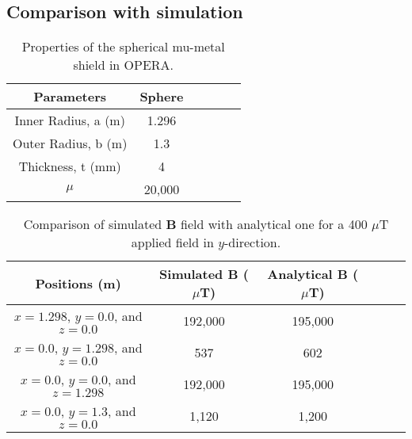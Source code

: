 \subsection{Comparison with simulation}

\begin{table} [!htb]
    \centering
    \begin{tabular} { |c|c|c|c|c|c|} 
        \hline
        Parameters & Sphere \\
        \hline\hline
        Inner Radius, a (m) & 1.296\\ 
        \hline
        Outer Radius, b (m) & 1.3 \\ 
        \hline
        Thickness, t (mm) & 4 \\ 
        \hline
        $\mu$  & 20,000 \\ 
        \hline

    \end{tabular}
    \caption{Properties of the spherical mu-metal shield in OPERA.}\label{tablE:opera_sphere}
\end{table}

\begin{table} [!htb]
    \centering
    \begin{tabular} { |c|c|c|c|c|c|} 
        \hline
        Positions (m) & Simulated $\bm{B}$ ($\mu$T) & Analytical $\bm{B}$ ($\mu$T)\\
        \hline\hline
        $x=1.298$, $y=0.0$, and $z=0.0$ & 192,000 & 195,000\\ 
        \hline
        $x=0.0$, $y=1.298$, and $z=0.0$ & 537 & 602\\ 
        \hline
        $x=0.0$, $y=0.0$, and $z=1.298$ & 192,000 & 195,000\\ 
        \hline
        $x=0.0$, $y=1.3$, and $z=0.0$ & 1,120 & 1,200\\ 
        \hline

    \end{tabular}
    \caption[Comparison of simulated $\bm{B}$ field with analytical one ]{Comparison of simulated $\bm{B}$ field with analytical one for a 400 $\mu$T applied field in $y$-direction.}\label{tablE:opera_analytical}
\end{table}

